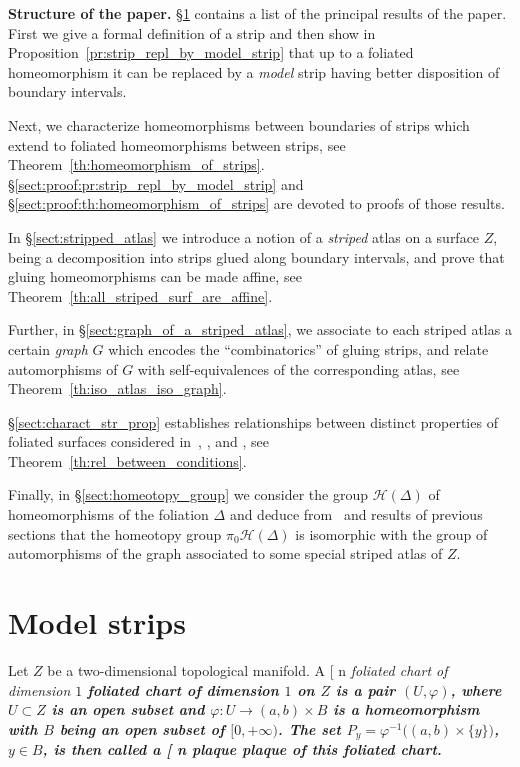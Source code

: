 \documentclass[12pt, reqno]{amsart}
\makeatletter
\def\myemphInternal#1{\if n\f@shape%
\begingroup\itshape #1\endgroup\/%
\else\begingroup\bfseries #1\endgroup%
\fi}
\def\myemph{\futurelet\testchar\MaybeOptArgmyemph}
\def\MaybeOptArgmyemph{\ifx[\testchar \let\next\OptArgmyemph
                 \else \let\next\NoOptArgmyemph \fi \next}
\def\OptArgmyemph[#1]#2{\index{#1}\myemphInternal{#2}}
\def\NoOptArgmyemph#1{\myemphInternal{#1}}
\newcommand\Usp{U}
\newcommand\chartMap{\varphi} %
\newcommand{\Btrans}{B}
\newcommand{\Partition}{\Delta}
\newcommand{\stripSurf}{Z}
\newcommand\HS{\mathcal{H}(\Partition)}
\newcommand\Homeo{\mathcal{H}}
\newcommand\Gr{G}
\makeatother
\begin{document}
{\bf Structure of the paper.}
\S\ref{sect:main_results} contains a list of the principal results of the paper.
First we give a formal definition of a strip and then show in Proposition~\ref{pr:strip_repl_by_model_strip} that up to a foliated homeomorphism it can be replaced by a \textit{model} strip having better disposition of boundary intervals.

Next, we characterize homeomorphisms between boundaries of strips which extend to foliated homeomorphisms between strips, see Theorem~\ref{th:homeomorphism_of_strips}.
\S\ref{sect:proof:pr:strip_repl_by_model_strip} and \S\ref{sect:proof:th:homeomorphism_of_strips} are devoted to proofs of those results.

In \S\ref{sect:stripped_atlas} we introduce a notion of a \textit{striped} atlas on a surface $\stripSurf$, being a decomposition into strips glued along boundary intervals, and prove that gluing homeomorphisms can be made affine, see Theorem~\ref{th:all_striped_surf_are_affine}.

Further, in \S\ref{sect:graph_of_a_striped_atlas}, we associate to each striped atlas a certain \textit{graph} $\Gr$ which encodes the ``combinatorics'' of gluing strips, and relate automorphisms of $\Gr$ with self-equivalences of the corresponding atlas, see Theorem~\ref{th:iso_atlas_iso_graph}.

\S\ref{sect:charact_str_prop} establishes relationships between distinct properties of foliated surfaces considered in~\cite{MaksymenkoPolulyakh:PGC:2015}, \cite{MaksymenkoPolulyakh:MFAT:2016}, and \cite{MaksymenkoPolulyakh:PGC:2016}, see Theorem~\ref{th:rel_between_conditions}.

Finally, in \S\ref{sect:homeotopy_group} we consider the group $\HS$ of homeomorphisms of the foliation $\Partition$ and deduce from~\cite{MaksymenkoPolulyakh:PGC:2015} and results of previous sections that the homeotopy group $\pi_0\Homeo(\Partition)$ is isomorphic with the group of automorphisms of the graph associated to some special striped atlas of $\stripSurf$.


\section{Model strips}\label{sect:main_results}
Let $\stripSurf$ be a two-dimensional topological manifold.
A \myemph{foliated chart of dimension $1$} on $\stripSurf$ is a pair $(\Usp, \chartMap)$, where $\Usp \subset \stripSurf$ is an open subset and $\chartMap : \Usp \to (a,b) \times \Btrans$ is a homeomorphism with $\Btrans$ being an open subset of $[0,+\infty)$.
The set $P_y = \chartMap^{-1}\bigl((a,b) \times \{y\}\bigr)$, $y \in \Btrans$, is then called a \myemph{plaque} of this foliated chart.
\end{document}

